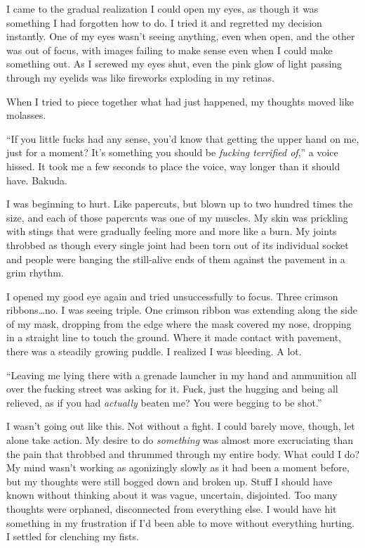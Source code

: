 





I came to the gradual realization I could open my eyes, as though it was something I had forgotten how to do.  I tried it and regretted my decision instantly.  One of my eyes wasn't seeing anything, even when open, and the other was out of focus, with images failing to make sense even when I could make something out.  As I screwed my eyes shut, even the pink glow of light passing through my eyelids was like fireworks exploding in my retinas.



When I tried to piece together what had just happened, my thoughts moved like molasses.



``If you little fucks had any sense, you'd know that getting the upper hand on me, just for a moment?  It's something you should be \emph{fucking terrified of},'' a voice hissed.  It took me a few seconds to place the voice, way longer than it should have.  Bakuda.



I was beginning to hurt.  Like papercuts, but blown up to two hundred times the size, and each of those papercuts was one of my muscles.  My skin was prickling with stings that were gradually feeling more and more like a burn.  My joints throbbed as though every single joint had been torn out of its individual socket and people were banging the still-alive ends of them against the pavement in a grim rhythm.



I opened my good eye again and tried unsuccessfully to focus.  Three crimson ribbons\ldots no.  I was seeing triple.  One crimson ribbon was extending along the side of my mask, dropping from the edge where the mask covered my nose, dropping in a straight line to touch the ground.  Where it made contact with pavement, there was a steadily growing puddle.  I realized I was bleeding.  A lot.



``Leaving me lying there with a grenade launcher in my hand and ammunition all over the fucking street was asking for it.  Fuck, just the hugging and being all relieved, as if you had \emph{actually} beaten me?  You were begging to be shot.''



I wasn't going out like this.  Not without a fight.  I could barely move, though, let alone take action.  My desire to do \emph{something} was almost more excruciating than the pain that throbbed and thrummed through my entire body.  What could I do?  My mind wasn't working as agonizingly slowly as it had been a moment before, but my thoughts were still bogged down and broken up.  Stuff I should have known without thinking about it was vague, uncertain, disjointed.  Too many thoughts were orphaned, disconnected from everything else.  I would have hit something in my frustration if I'd been able to move without everything hurting.  I settled for clenching my fists.



